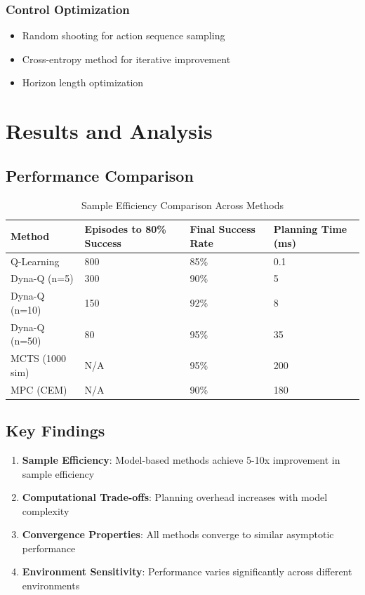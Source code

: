 \documentclass[12pt]{article}
\numberwithin{equation}{section}
\numberwithin{figure}{section}
\numberwithin{table}{section}
\numberwithin{algorithm}{section}
\begin{document}
{{{\subsubsection{Control Optimization}
\begin{itemize}
    \item Random shooting for action sequence sampling
    \item Cross-entropy method for iterative improvement
    \item Horizon length optimization
\end{itemize}

\section{Results and Analysis}

\subsection{Performance Comparison}

\begin{table}[H]
\centering
\caption{Sample Efficiency Comparison Across Methods}
\begin{tabular}{|l|l|l|l|}
\hline
\textbf{Method} & \textbf{Episodes to 80\% Success} & \textbf{Final Success Rate} & \textbf{Planning Time (ms)} \\
\hline
Q-Learning & 800 & 85\% & 0.1 \\
Dyna-Q (n=5) & 300 & 90\% & 5 \\
Dyna-Q (n=10) & 150 & 92\% & 8 \\
Dyna-Q (n=50) & 80 & 95\% & 35 \\
MCTS (1000 sim) & N/A & 95\% & 200 \\
MPC (CEM) & N/A & 90\% & 180 \\
\hline
\end{tabular}
\end{table}

\subsection{Key Findings}

\begin{enumerate}
    \item \textbf{Sample Efficiency}: Model-based methods achieve 5-10x improvement in sample efficiency
    \item \textbf{Computational Trade-offs}: Planning overhead increases with model complexity
    \item \textbf{Convergence Properties}: All methods converge to similar asymptotic performance
    \item \textbf{Environment Sensitivity}: Performance varies significantly across different environments
\end{enumerate}

}}}
\end{document}

